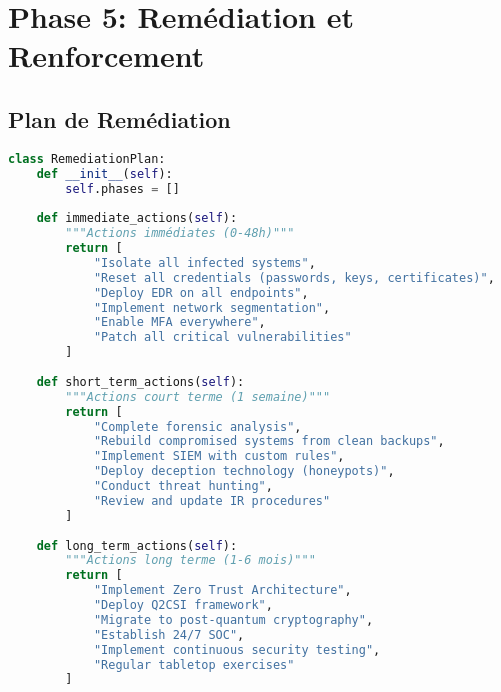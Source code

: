 \section{Phase 5: Remédiation et Renforcement}
\subsection{Plan de Remédiation}
\begin{lstlisting}[language=Python, caption=Plan de remédiation]
class RemediationPlan:
    def __init__(self):
        self.phases = []
    
    def immediate_actions(self):
        """Actions immédiates (0-48h)"""
        return [
            "Isolate all infected systems",
            "Reset all credentials (passwords, keys, certificates)",
            "Deploy EDR on all endpoints",
            "Implement network segmentation",
            "Enable MFA everywhere",
            "Patch all critical vulnerabilities"
        ]
    
    def short_term_actions(self):
        """Actions court terme (1 semaine)"""
        return [
            "Complete forensic analysis",
            "Rebuild compromised systems from clean backups",
            "Implement SIEM with custom rules",
            "Deploy deception technology (honeypots)",
            "Conduct threat hunting",
            "Review and update IR procedures"
        ]
    
    def long_term_actions(self):
        """Actions long terme (1-6 mois)"""
        return [
            "Implement Zero Trust Architecture",
            "Deploy Q2CSI framework",
            "Migrate to post-quantum cryptography",
            "Establish 24/7 SOC",
            "Implement continuous security testing",
            "Regular tabletop exercises"
        ]
\end{lstlisting}

